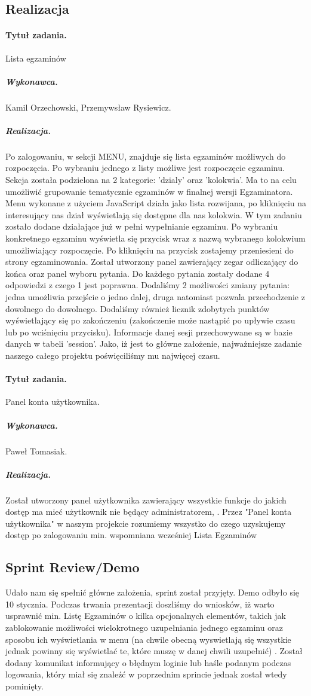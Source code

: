 \documentclass[a4paper]{article}
\begin{document}
\subsection{Realizacja}

\paragraph{Tytuł zadania.}  Lista egzaminów
\subparagraph{Wykonawca.} Kamil Orzechowski, Przemywsław Rysiewicz.
\subparagraph{Realizacja.} Po zalogowaniu, w sekcji MENU, znajduje się lista egzaminów możliwych do rozpoczęcia. Po wybraniu jednego z listy możliwe jest rozpoczęcie egzaminu. Sekcja została podzielona na 2 kategorie: 'dzialy' oraz 'kolokwia'. Ma to na celu umożliwić grupowanie tematycznie egzaminów w finalnej wersji Egzaminatora. Menu wykonane z użyciem JavaScript działa jako lista rozwijana, po kliknięciu na interesujący nas dział wyświetlają się dostępne dla nas kolokwia. W tym zadaniu zostało dodane działające już w pełni wypełnianie egzaminu. Po wybraniu konkretnego egzaminu wyświetla się przycisk wraz z nazwą wybranego kolokwium umożliwiający rozpoczęcie. Po kliknięciu na przycisk zostajemy przeniesieni do strony egzaminowania.  Został utworzony panel zawierający zegar odliczający do końca oraz panel wyboru pytania. Do każdego pytania zostały dodane 4 odpowiedzi z czego 1 jest poprawna. Dodaliśmy 2 możliwości zmiany pytania: jedna umożliwia przejście o jedno dalej, druga natomiast pozwala przechodzenie z dowolnego do dowolnego. Dodaliśmy również licznik zdobytych punktów wyświetlający się po zakończeniu (zakończenie może nastąpić po upływie czasu lub po wciśnięciu przycisku). Informacje danej sesji przechowywane są w bazie danych w tabeli 'session'. Jako, iż jest to główne założenie, najważniejsze zadanie naszego całego projektu poświęciliśmy mu najwięcej czasu. 

\paragraph{Tytuł zadania.} Panel konta użytkownika.
\subparagraph{Wykonawca.} Paweł Tomasiak.
\subparagraph{Realizacja.} Został utworzony panel użytkownika zawierający wszystkie funkcje do jakich dostęp ma mieć użytkownik nie będący administratorem, . Przez "Panel konta użytkownika" w naszym projekcie rozumiemy wszystko do czego uzyskujemy dostęp po zalogowaniu min. wspomniana wcześniej Lista Egzaminów 
 
\subsection{Sprint Review/Demo}
Udało nam się spełnić główne założenia, sprint został przyjęty. Demo odbyło się 10 stycznia. Podczas trwania prezentacji doszliśmy do wniosków, iż warto usprawnić min. Listę Egzaminów o kilka opcjonalnych elementów, takich jak zablokowanie możliwości wielokrotnego uzupełniania jednego egzaminu oraz sposobu  ich wyświetlania w menu (na chwile obecną wyswietlają się wszystkie jednak powinny się wyświetlać te, które muszę w danej chwili uzupełnić) .  Został dodany komunikat informujący o błędnym loginie lub haśle podanym podczas logowania, który miał się znaleźć w poprzednim sprincie jednak został wtedy pominięty. 
\end{document}
